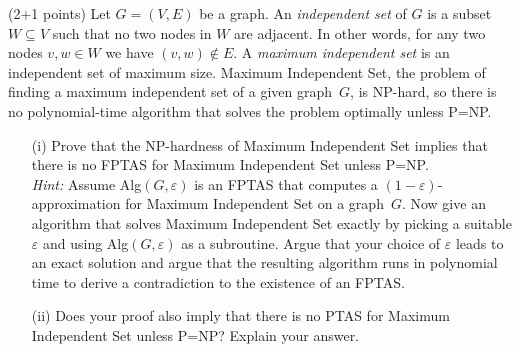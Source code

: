 \documentclass{article}
\newcommand{\eps}{\varepsilon}
\newcounter{rcounter}
\newenvironment{rlist}%
{\begin{list}{\setnr-\arabic{rcounter}}{\usecounter{rcounter}}}{\end{list}}
\begin{document}
\begin{rlist}
		\item (2+1 points)
		Let $G=(V,E)$ be a graph. An \emph{independent set} of $G$ is a subset $W\subseteq V$
		such that no two nodes in $W$ are adjacent. In other words, for any two nodes $v,w\in W$ we
		have $(v,w)\not\in E$. A \emph{maximum independent set} is an independent set of maximum size.
		{\sc Maximum Independent Set}, the problem of finding a maximum independent set of a
		given graph~$G$, is NP-hard, so there is no polynomial-time algorithm that solves the
		problem optimally unless P=NP.
		\begin{enumerate}
			\item[(i)]
			Prove that the NP-hardness of {\sc Maximum Independent Set} implies that there is 
			no FPTAS for {\sc Maximum Independent Set} unless P=NP.
			\\[2mm]
			\emph{Hint:} Assume {\sc Alg}$(G,\eps)$ is an FPTAS that computes a $(1-\eps)$-approximation
			for {\sc Maximum Independent Set} on a graph~$G$. Now give an algorithm that solves
			{\sc Maximum Independent Set} exactly by picking a suitable $\eps$ and using
			{\sc Alg}$(G,\eps)$ as a subroutine. Argue that your choice of $\eps$ leads to
			an exact solution and argue that the resulting algorithm runs in polynomial time
			to derive a contradiction to the existence of an FPTAS.
			\item[(ii)]
			Does your proof also imply that there is no PTAS for {\sc Maximum Independent Set} unless P=NP?
            Explain your answer.
		\end{enumerate}
	\end{rlist}
\end{document}
